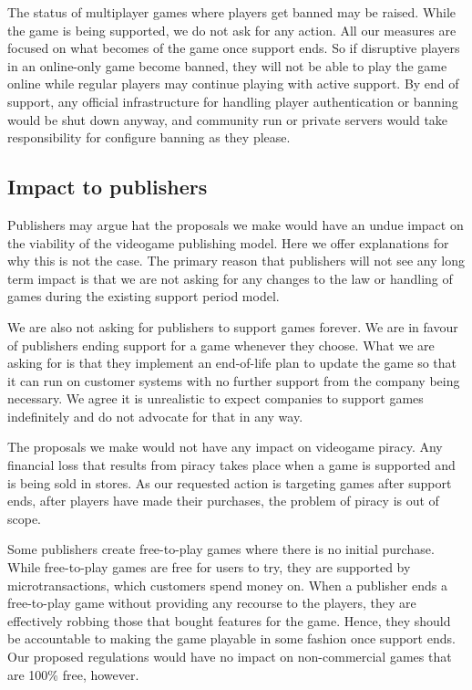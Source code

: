 The status of multiplayer games where players get banned may be raised.
While the game is being supported, we do not ask for any action.
All our measures are focused on what becomes of the game once support ends.
So if disruptive players in an online-only game become banned,
they will not be able to play the game online while regular players may continue playing with active support.
By end of support, any official infrastructure for handling player authentication or banning would be shut down anyway,
and community run or private servers would take responsibility for configure banning as they please.

\subsection{Impact to publishers}
Publishers may argue hat the proposals we make would have an undue impact on the viability of the videogame publishing model.
Here we offer explanations for why this is not the case.
The primary reason that publishers will not see any long term impact is that we are not asking for any changes to the law or handling of games during the existing support period model.

We are also not asking for publishers to support games forever.
We are in favour of publishers ending support for a game whenever they choose.
What we are asking for is that they implement an end-of-life plan to \gls{update} the game
so that it can run on customer systems with no further support from the company being necessary.
We agree it is unrealistic to expect companies to support games indefinitely and do not advocate for that in any way.

The proposals we make would not have any impact on videogame piracy.
Any financial loss that results from piracy takes place when a game is supported and is being sold in stores.
As our requested action is targeting games after support ends, after players have made their purchases, the problem of piracy is out of scope.

Some publishers create free-to-play games where there is no initial purchase.
While free-to-play games are free for users to try, they are supported by \glspl{microtransaction}, which customers spend money on.
When a publisher ends a free-to-play game without providing any recourse to the players, they are effectively robbing those that bought features for the game.
Hence, they should be accountable to making the game playable in some fashion once support ends.
Our proposed regulations would have no impact on non-commercial games that are 100\% free, however.


